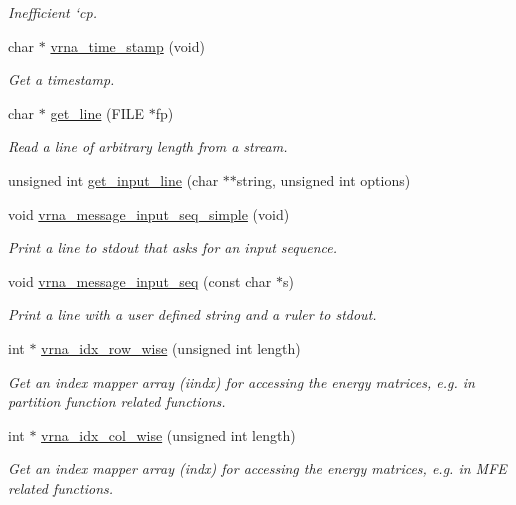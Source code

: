 \begin{DoxyCompactItemize}
\begin{DoxyCompactList}\small\item\em Inefficient `cp\textquotesingle{}. \end{DoxyCompactList}\item 
char $\ast$ \hyperlink{group__utils_gad3bbe8d01afb1310609cb018d5290550}{vrna\+\_\+time\+\_\+stamp} (void)
\begin{DoxyCompactList}\small\item\em Get a timestamp. \end{DoxyCompactList}\item 
char $\ast$ \hyperlink{group__utils_gabe51806d14cff0789a8c1df7dbc45b71}{get\+\_\+line} (F\+I\+LE $\ast$fp)
\begin{DoxyCompactList}\small\item\em Read a line of arbitrary length from a stream. \end{DoxyCompactList}\item 
unsigned int \hyperlink{group__utils_ga8ef1835eb83f542396f59f0b205965e5}{get\+\_\+input\+\_\+line} (char $\ast$$\ast$string, unsigned int options)
\item 
void \hyperlink{group__utils_gaee1dd652ca5b9e56b096963a1576f73b}{vrna\+\_\+message\+\_\+input\+\_\+seq\+\_\+simple} (void)
\begin{DoxyCompactList}\small\item\em Print a line to {\itshape stdout} that asks for an input sequence. \end{DoxyCompactList}\item 
void \hyperlink{group__utils_gaf4d194d558b0c975f269de01dea52460}{vrna\+\_\+message\+\_\+input\+\_\+seq} (const char $\ast$s)
\begin{DoxyCompactList}\small\item\em Print a line with a user defined string and a ruler to stdout. \end{DoxyCompactList}\item 
int $\ast$ \hyperlink{group__utils_ga70b180e9ea764218a82647a1cd347445}{vrna\+\_\+idx\+\_\+row\+\_\+wise} (unsigned int length)
\begin{DoxyCompactList}\small\item\em Get an index mapper array (iindx) for accessing the energy matrices, e.\+g. in partition function related functions. \end{DoxyCompactList}\item 
int $\ast$ \hyperlink{group__utils_ga89ebc69c52fa0c78c9e1974b0017746b}{vrna\+\_\+idx\+\_\+col\+\_\+wise} (unsigned int length)
\begin{DoxyCompactList}\small\item\em Get an index mapper array (indx) for accessing the energy matrices, e.\+g. in M\+FE related functions. \end{DoxyCompactList}\end{DoxyCompactItemize}
